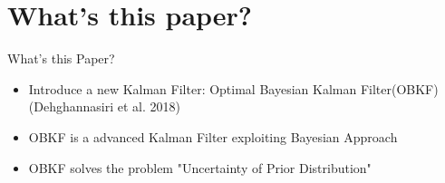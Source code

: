 \section{What's this paper?}
\begin{frame}
    \tableofcontents[currentsection]
\end{frame}

\begin{frame}{What's this Paper?}
\begin{itemize}
    \item Introduce a new Kalman Filter: Optimal Bayesian Kalman Filter(OBKF)(Dehghannasiri et al. 2018)
    \item OBKF is a advanced Kalman Filter exploiting Bayesian Approach
    \item OBKF solves the problem "Uncertainty of Prior Distribution"
\end{itemize}
\end{frame}